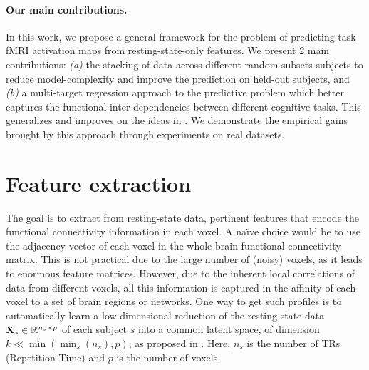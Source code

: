 \paragraph*{\textbf{Our main contributions.}}
In this work, we propose a general framework for the problem of predicting task fMRI activation maps from resting-state-only features.
We present 2 main contributions: \textit{(a)} the stacking of data across different
random subsets subjects to reduce model-complexity and improve the prediction on held-out subjects, and
\textit{(b)} a multi-target regression approach to the
predictive problem which better captures the functional inter-dependencies between different cognitive tasks.
%
This generalizes and improves on the ideas in \citep{tavor2016task}.
We demonstrate the empirical gains brought by this approach through
experiments on real datasets.

\section{Feature extraction}
\label{sec:fe}
The goal is to extract from resting-state data, pertinent features
that encode the functional connectivity information in each voxel.
%
A na\"ive choice would be to use the adjacency vector of each
voxel in the whole-brain functional connectivity matrix. 
%
This is not practical due to the large number of (noisy) voxels, as it
leads to enormous feature matrices. However, due to the inherent local
correlations of data from different voxels,
%
all this information is captured in the affinity of each voxel to a set
of brain regions or networks.
%
One way to get such profiles is to automatically learn a
low-dimensional reduction of the resting-state data $\mathbf{X}_s \in \mathbb R^{n_s \times p}$ of
each subject $s$ into a
common latent space, of dimension $k \ll \min(\min_s(n_s), p)$, as
proposed in \citep{tavor2016task}. Here, $n_s$ is the number of TRs (Repetition Time)
and $p$ is the number of voxels.

